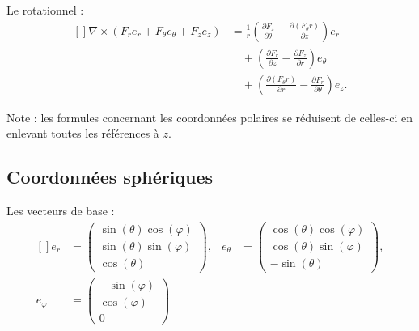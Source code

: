 Le rotationnel :
\begin{equation}
	\begin{aligned}[]
		\nabla\times(F_re_r+F_{\theta}e_{\theta}+F_ze_z) & =\frac{1}{ r }\left( \frac{ \partial F_z }{ \partial \theta }-\frac{ \partial (F_{\theta}r) }{ \partial z } \right)e_r \\
		                                                 & \quad+\left( \frac{ \partial F_r }{ \partial z }-\frac{ \partial F_z }{ \partial r } \right)e_{\theta}                 \\
		                                                 & \quad+\left( \frac{ \partial (F_{\theta} r) }{ \partial r }-\frac{ \partial F_r }{ \partial \theta } \right)e_z.
	\end{aligned}
\end{equation}

Note : les formules concernant les coordonnées polaires se réduisent de celles-ci en enlevant toutes les références à \( z\).

\subsection{Coordonnées sphériques}

Les vecteurs de base :
\begin{equation}
	\begin{aligned}[]
		e_r         & =\begin{pmatrix}
			               \sin(\theta)\cos(\varphi) \\
			               \sin(\theta)\sin(\varphi) \\
			               \cos(\theta)
		               \end{pmatrix},
		            & e_{\theta}                   & =
		\begin{pmatrix}
			\cos(\theta)\cos(\varphi) \\
			\cos(\theta)\sin(\varphi) \\
			-\sin(\theta)
		\end{pmatrix},                      \\
		e_{\varphi} & =
		\begin{pmatrix}
			-\sin(\varphi) \\
			\cos(\varphi)  \\
			0
		\end{pmatrix}
	\end{aligned}
\end{equation}


